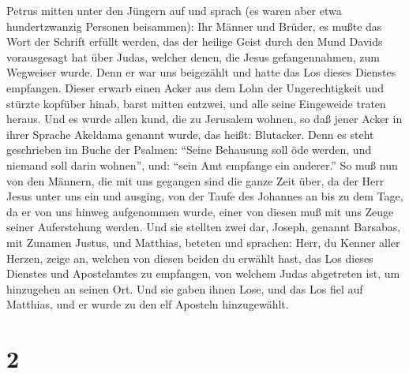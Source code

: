 Petrus mitten unter den Jüngern auf und sprach (es waren aber etwa
hundertzwanzig Personen beisammen):  Ihr Männer und
Brüder, es mußte das Wort der Schrift erfüllt werden, das der heilige
Geist durch den Mund Davids vorausgesagt hat über Judas, welcher denen,
die Jesus gefangennahmen, zum Wegweiser wurde.  Denn er
war uns beigezählt und hatte das Los dieses Dienstes empfangen.
 Dieser erwarb einen Acker aus dem Lohn der
Ungerechtigkeit und stürzte kopfüber hinab, barst mitten entzwei, und
alle seine Eingeweide traten heraus.  Und es wurde allen
kund, die zu Jerusalem wohnen, so daß jener Acker in ihrer Sprache
Akeldama genannt wurde, das heißt: Blutacker.  Denn es
steht geschrieben im Buche der Psalmen: ``Seine Behausung soll öde
werden, und niemand soll darin wohnen'', und: ``sein Amt empfange ein
anderer.''  So muß nun von den Männern, die mit uns
gegangen sind die ganze Zeit über, da der Herr Jesus unter uns ein und
ausging,  von der Taufe des Johannes an bis zu dem Tage,
da er von uns hinweg aufgenommen wurde, einer von diesen muß mit uns
Zeuge seiner Auferstehung werden.  Und sie stellten zwei
dar, Joseph, genannt Barsabas, mit Zunamen Justus, und Matthias,
 beteten und sprachen: Herr, du Kenner aller Herzen,
zeige an, welchen von diesen beiden du erwählt hast,  das
Los dieses Dienstes und Apostelamtes zu empfangen, von welchem Judas
abgetreten ist, um hinzugehen an seinen Ort.  Und sie
gaben ihnen Lose, und das Los fiel auf Matthias, und er wurde zu den elf
Aposteln hinzugewählt.

\hypertarget{section-1}{%
\section{2}\label{section-1}}

